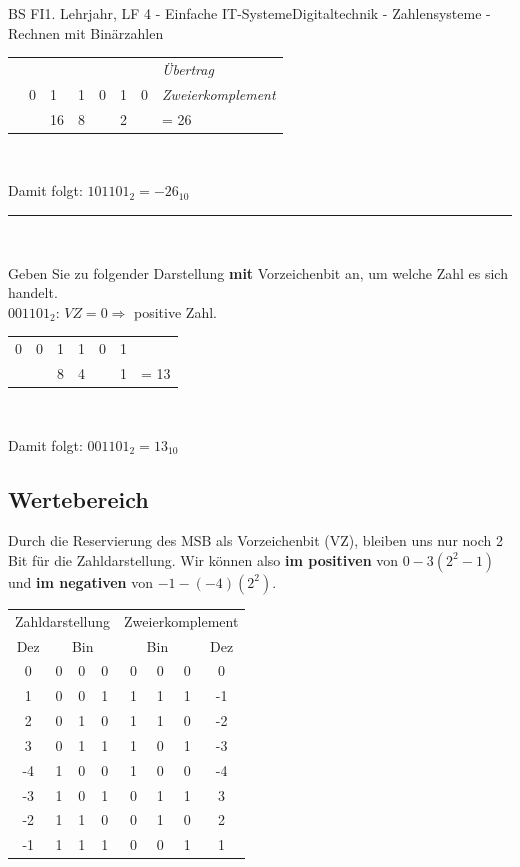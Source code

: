\documentclass[11pt,twocolumn,oneside,openany,headings=optiontotoc,11pt,numbers=noenddot]{article}
\begin{document}
\begin{worksheet}{BS FI}{1. Lehrjahr, LF 4 - Einfache IT-Systeme}{Digitaltechnik - Zahlensysteme - Rechnen mit Binärzahlen}
\begin{tabularx}{0.48\textwidth}{rllllll|l}
			& & & & & \color{codegray}{\tiny{1}} & & \textit{\tiny{Übertrag}}\normalsize\\
			\cline{1-8}
			& 0 & 1 & 1 & 0 & 1 & 0 & \textit{Zweierkomplement}\\
			& & 16 & 8 &  & 2 & & = 26
		\end{tabularx}\\
		\par\noindent
		Damit folgt: \(101101_2 = -26_{10}\)\\
		\par\noindent
		\rule{0.48\textwidth}{0.1pt}\\
		\par\noindent
		Geben Sie zu folgender Darstellung \textbf{mit} Vorzeichenbit an, um welche Zahl es sich handelt.\\
		\colorbox{green!10}{\(0\)}\(01101_{2}\): \(VZ = 0 \Rightarrow \) positive Zahl.\\
		\par\noindent
		\begin{tabularx}{0.48\textwidth}{llllllr}
			0 & 0 & 1 & 1 & 0 & 1\\
			& & 8 & 4 & & 1 & = 13
		\end{tabularx}\\
		\par\noindent
		Damit folgt: \(001101_2 = 13_{10}\)\\
		\subsection{Wertebereich}
		Durch die Reservierung des MSB als Vorzeichenbit (VZ), bleiben uns nur noch 2 Bit für die Zahldarstellung. Wir können also \textbf{im positiven} von \(0 - 3 (2^2-1)\) und \textbf{im negativen} von \(-1 - (-4) (2^2)\).\\
		\par\noindent
		\begin{tabularx}{0.48\textwidth}{c|lll||rrr|c}
			\multicolumn{4}{c||}{Zahldarstellung} & \multicolumn{4}{c}{Zweierkomplement}\\
			Dez & \multicolumn{3}{c||}{Bin} & \multicolumn{3}{c}{Bin} & Dez\\
			\cline{1-8}
			0 & 0 & 0 & 0 & 0 & 0 & 0 & 0\\
			1 & 0 & 0 & 1 & 1 & 1 & 1 & -1\\
			2 & 0 & 1 & 0 & 1 & 1 & 0 & -2\\
			3 & 0 & 1 & 1 & 1 & 0 & 1 & -3\\
			-4 & 1 & 0 & 0 & 1 & 0 & 0 & -4\\
			-3 & 1 & 0 & 1 & 0 & 1 & 1 & 3\\
			-2 & 1 & 1 & 0 & 0 & 1 & 0 & 2\\
			-1 & 1 & 1 & 1 & 0 & 0 & 1 & 1
			

\end{tabularx}
\end{worksheet}
\end{document}
